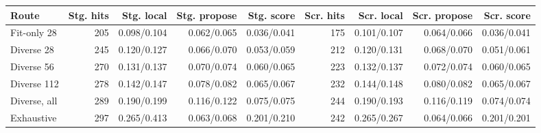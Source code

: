 \begin{tabular}{lrrrrrrrr}
\toprule
Route & Stg. hits & Stg. local & Stg. propose & Stg. score & Scr. hits & Scr. local & Scr. propose & Scr. score \\
\midrule
Fit-only 28 & 205 & 0.098/0.104 & 0.062/0.065 & 0.036/0.041 & 175 & 0.101/0.107 & 0.064/0.066 & 0.036/0.041 \\
Diverse 28 & 245 & 0.120/0.127 & 0.066/0.070 & 0.053/0.059 & 212 & 0.120/0.131 & 0.068/0.070 & 0.051/0.061 \\
Diverse 56 & 270 & 0.131/0.137 & 0.070/0.074 & 0.060/0.065 & 223 & 0.132/0.137 & 0.072/0.074 & 0.060/0.065 \\
Diverse 112 & 278 & 0.142/0.147 & 0.078/0.082 & 0.065/0.067 & 232 & 0.144/0.148 & 0.080/0.082 & 0.065/0.067 \\
Diverse, all & 289 & 0.190/0.199 & 0.116/0.122 & 0.075/0.075 & 244 & 0.190/0.193 & 0.116/0.119 & 0.074/0.074 \\
Exhaustive & 297 & 0.265/0.413 & 0.063/0.068 & 0.201/0.210 & 242 & 0.265/0.267 & 0.064/0.066 & 0.201/0.201 \\
\bottomrule
\end{tabular}
